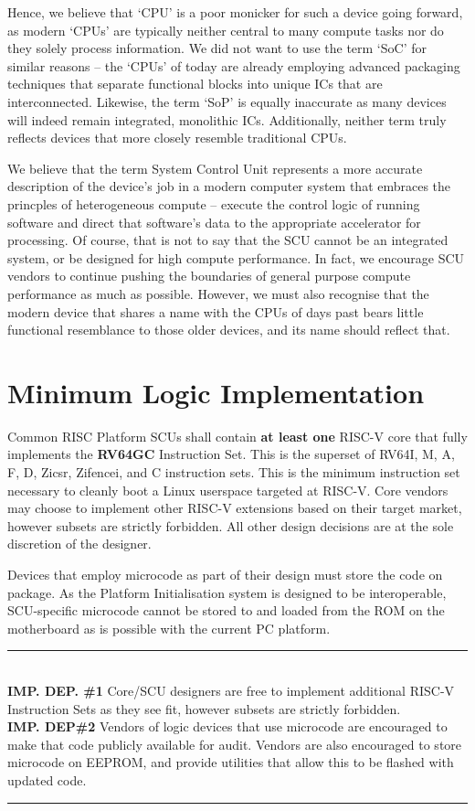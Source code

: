 \documentclass[12pt]{report}
\begin{document}
Hence, we believe that `CPU' is a poor monicker for such a device going forward, as modern `CPUs' are typically neither
central to many compute tasks nor do they solely process information. We did not want to use the term `SoC' for similar
reasons -- the `CPUs' of today are already employing advanced packaging techniques that separate functional blocks into
unique ICs that are interconnected. Likewise, the term `SoP' is equally inaccurate as many devices will indeed remain
integrated, monolithic ICs. Additionally, neither term truly reflects devices that more closely resemble traditional CPUs.

We believe that the term System Control Unit represents a more accurate description of the device's job in a modern
computer system that embraces the princples of heterogeneous compute -- execute the control logic of running software and
direct that software's data to the appropriate accelerator for processing. Of course, that is not to say that the SCU cannot
be an integrated system, or be designed for high compute performance. In fact, we encourage SCU vendors to continue
pushing the boundaries of general purpose compute performance as much as possible. However, we must also recognise that
the modern device that shares a name with the CPUs of days past bears little functional resemblance to those older devices,
and its name should reflect that.

\section{Minimum Logic Implementation}
Common RISC Platform SCUs shall contain \textbf{at least one} RISC-V core that fully implements the \textbf{RV64GC} Instruction
Set. This is the superset of RV64I, M, A, F, D, Zicsr, Zifencei, and C instruction sets. This is the minimum instruction
set necessary to cleanly boot a Linux userspace targeted at RISC-V. Core vendors may choose to implement other RISC-V
extensions based on their target market, however subsets are strictly forbidden. All other design decisions are at the
sole discretion of the designer.

Devices that employ microcode as part of their design must store the code on package. As the Platform Initialisation
system is designed to be interoperable, SCU-specific microcode cannot be stored to and loaded from the ROM on the
motherboard as is possible with the current PC platform.

\rule{16cm}{0.4pt}\\
\small
\textbf{IMP. DEP. \#1\:}
Core/SCU designers are free to implement additional RISC-V Instruction Sets as they see fit, however subsets are
strictly forbidden.\\
\textbf{IMP. DEP\#2\:}
Vendors of logic devices that use microcode are encouraged to make that code publicly available for audit. Vendors are
also encouraged to store microcode on EEPROM, and provide utilities that allow this to be flashed with updated code.\\
\normalsize
\rule{16cm}{0.4pt}
\newpage
\end{document}
